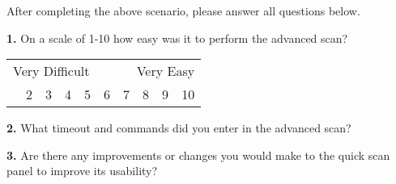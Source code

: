 After completing the above scenario, please answer all questions below.

\vspace{0.5cm}

\textbf{1.} On a scale of 1-10 how easy was it to perform the advanced scan?

\begin{table}[h]
	\centering
	\begin{tabularx}{\textwidth}{XXXXXXXXXX}
		\multicolumn{5}{l}{Very Difficult} & \multicolumn{5}{r}{Very Easy} \\
		\centering
		1    & 2    & 3    & 4    & 5    & 6    & 7    & 8    & 9    & 10
	\end{tabularx}
\end{table}

\textbf{2.} What timeout and commands did you enter in the advanced scan?

\vspace{3cm}

\textbf{3.} Are there any improvements or changes you would make to the quick scan panel to improve its usability?
